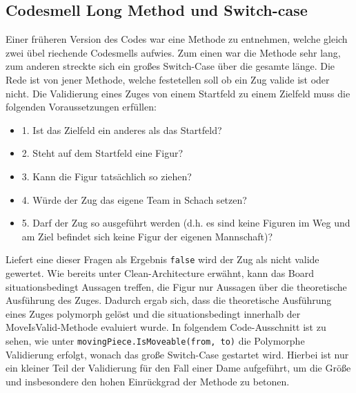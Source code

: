 \documentclass{article}
\begin{document}
\subsection{Codesmell Long Method und Switch-case}
Einer früheren Version des Codes war eine Methode zu entnehmen, welche gleich zwei übel riechende Codesmells aufwies. Zum einen war die Methode sehr lang, zum anderen streckte sich ein großes Switch-Case über die gesamte länge. Die Rede ist von jener Methode, welche festetellen soll ob ein Zug valide ist oder nicht. Die Validierung eines Zuges von einem Startfeld zu einem Zielfeld muss die folgenden Voraussetzungen erfüllen:
\begin{center}
	\begin{itemize}
		\item 1. Ist das Zielfeld ein anderes als das Startfeld?
		\item 2. Steht auf dem Startfeld eine Figur?
		\item 3. Kann die Figur tatsächlich so ziehen?
		\item 4. Würde der Zug das eigene Team in Schach setzen?
		\item 5. Darf der Zug so ausgeführt werden (d.h. es sind keine Figuren im Weg und am Ziel befindet sich keine Figur der eigenen Mannschaft)?
	\end{itemize}
\end{center}
Liefert eine dieser Fragen als Ergebnis \texttt{false} wird der Zug als nicht valide gewertet. Wie bereits unter Clean-Architecture erwähnt, kann das Board situationsbedingt Aussagen treffen, die Figur nur Aussagen über die theoretische Ausführung des Zuges. Dadurch ergab sich, dass die theoretische Ausführung eines Zuges polymorph gelöst und die situationsbedingt innerhalb der MoveIsValid-Methode evaluiert wurde. In folgendem Code-Ausschnitt ist zu sehen, wie unter \texttt{movingPiece.IsMoveable(from, to)} die Polymorphe Validierung erfolgt, wonach das große Switch-Case gestartet wird. Hierbei ist nur ein kleiner Teil der Validierung für den Fall einer Dame aufgeführt, um die Größe  und insbesondere den hohen Einrückgrad der Methode zu betonen. 
\end{document}
